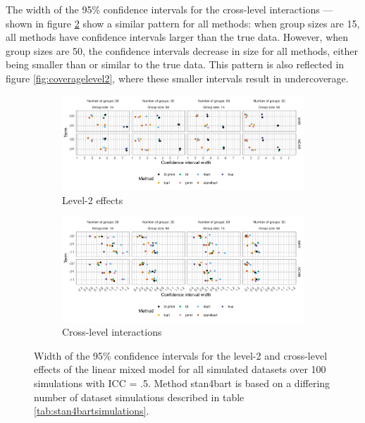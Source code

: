 \documentclass[3p,12pt,a4paper]{elsarticle}
\begin{document}
The width of the 95\% confidence intervals for the cross-level interactions --- shown in figure \ref{fig:ciwcrosslevel} show a similar pattern for all methods: when group sizes are 15, all methods have confidence intervals larger than the true data. However, when group sizes are 50, the confidence intervals decrease in size for all methods, either being smaller than or similar to the true data. This pattern is also reflected in figure \ref{fig:coveragelevel2}, where these smaller intervals result in undercoverage.

\begin{figure}
    \centering 
    \begin{subfigure}[b]{1\textwidth}
        \centering
        \includegraphics[width=1\textwidth]{ciwlevel2.png}
        \caption{Level-2 effects}
        \label{fig:ciwlevel2}
    \end{subfigure}
    \begin{subfigure}[b]{1\textwidth}
        \centering
        \includegraphics[width=1\textwidth]{ciwcrosslevel.png}
        \caption{Cross-level interactions}
        \label{fig:ciwcrosslevel}
    \end{subfigure}
    \caption{Width of the 95\% confidence intervals for the level-2 and cross-level effects of the linear mixed model for all simulated datasets over 100 simulations with ICC = .5. Method stan4bart is based on a differing number of dataset simulations described in table \ref{tab:stan4bartsimulations}.}
    \label{fig:ciwlevel2crosslevel}
\end{figure}
\end{document}
